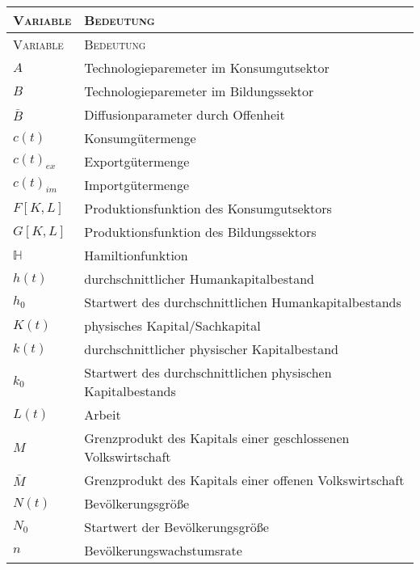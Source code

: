 \begin{center}
\begin{longtable}{|l|l|} %
	\hline
	\textsc{Variable} & \textsc{Bedeutung}\\
	\hline
	\endfirsthead
	
	\hline
	\textsc{Variable} & \textsc{Bedeutung}\\
	\hline
	\endhead
	
	\hline
	\endfoot

	\endlastfoot
	
		$A$ & Technologieparemeter im Konsumgutsektor\\%
		$B$ & Technologieparemeter im Bildungssektor\\%
		$\bar{B}$ & Diffusionparameter durch Offenheit\\%
		$c(t)$ & Konsumgütermenge\\%
		$c(t)_{ex}$ & Exportgütermenge\\%
		$c(t)_{im}$ & Importgütermenge\\%
		$F[K,L]$ & Produktionsfunktion des Konsumgutsektors\\%
		$G[K,L]$ & Produktionsfunktion des Bildungssektors\\%
		$\mathbb{H}$ & Hamiltionfunktion\\%
		$h(t)$ & durchschnittlicher Humankapitalbestand\\%
		$h_{0}$ & Startwert des durchschnittlichen Humankapitalbestands\\%
		$K(t)$ & physisches Kapital/Sachkapital\\ %
		$k(t)$ & durchschnittlicher physischer Kapitalbestand\\%
		$k_{0}$ & Startwert des durchschnittlichen physischen Kapitalbestands\\%
		$L(t)$ & Arbeit\\%
		$M$ & Grenzprodukt des Kapitals einer geschlossenen Volkswirtschaft\\
	  $\bar{M}$ & Grenzprodukt des Kapitals einer offenen Volkswirtschaft\\%
		$N(t)$ & Bevölkerungsgrö{\ss}e\\%
		$N_0$ & Startwert der Bevölkerungsgrö{\ss}e\\
		$n$ & Bevölkerungswachstumsrate\\%

\end{longtable}
\end{center}
